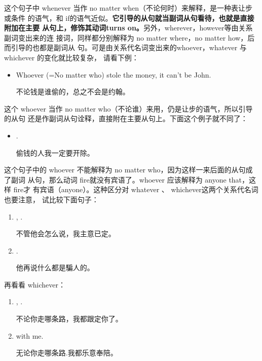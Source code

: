 这个句子中 whenever 当作 no matter when（不论何时）来解释，是一种表让步或条件
的语气，和 if的语气近似。\textbf{它引导的从句就当副词从句看待，也就是直接附加在主要
  从句上，修饰其动词turns on。}另外，wherever，however等由关系副词变出来的连
接词，同样都分别解释为 no matter where，no matter how，后而引导的也都是副词从
句。可是由关系代名词变出来的whoever，whatever 与 whichever 的变化就比较复杂，
请看下例：
\begin{itemize}
\item Whoever (=No matter who) stole the money, it can't be John.

  不论钱是谁偷的，总之不会是约翰。
\end{itemize}
这个 whoever 当作 no matter who（不论谁）来用，仍是让步的语气，所以引导的从句
还是作副词从句诠释，直接附在主要从句上。下面这个例子就不同了：
\begin{itemize}
\item {} .

  偷钱的人我一定要开除。
\end{itemize}
这个句子中的 whoever 不能解释为 no matter who，因为这样一来后面的从句成了副词
从句，那么动词 fire就没有宾语了。whoever 应该解释为 anyone that，这样 fire才
有宾语（anyone）。这种区分对 whatever 、 whichever这两个关系代名词也要注意，
试比较下面句子：
\begin{enumerate}
\item {},   .

  不管他会怎么说，我主意已定。
\item {}  .

  他再说什么都是騙人的。
\end{enumerate}

再看看 whichever：
\begin{enumerate}
\item {},
  .

  不论你走哪条路，我都跟定你了。
\item {}   with me.

  无论你走哪条路.我都乐意奉陪。
\end{enumerate}

